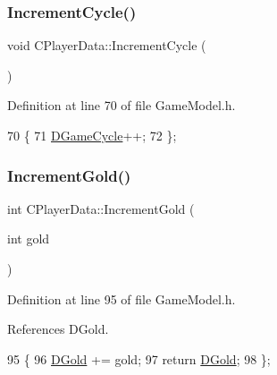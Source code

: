 \subsubsection{\texorpdfstring{Increment\+Cycle()}{IncrementCycle()}}
{\footnotesize\ttfamily void C\+Player\+Data\+::\+Increment\+Cycle (\begin{DoxyParamCaption}{ }\end{DoxyParamCaption})\hspace{0.3cm}{\ttfamily [inline]}}



Definition at line 70 of file Game\+Model.\+h.


\begin{DoxyCode}
70                              \{
71             \hyperlink{classCPlayerData_ae92ca06a63a01681dd9f3ddc17c0e106}{DGameCycle}++;
72         \};
\end{DoxyCode}
\hypertarget{classCPlayerData_a4d99d876561ac76a9d4f7a3e2f7f3edb}{}\label{classCPlayerData_a4d99d876561ac76a9d4f7a3e2f7f3edb} 
\subsubsection{\texorpdfstring{Increment\+Gold()}{IncrementGold()}}
{\footnotesize\ttfamily int C\+Player\+Data\+::\+Increment\+Gold (\begin{DoxyParamCaption}\item[{int}]{gold }\end{DoxyParamCaption})\hspace{0.3cm}{\ttfamily [inline]}}



Definition at line 95 of file Game\+Model.\+h.



References D\+Gold.


\begin{DoxyCode}
95                                    \{
96             \hyperlink{classCPlayerData_afa66ff31262c9b287ae8c13259aae6f3}{DGold} += gold;
97             \textcolor{keywordflow}{return} \hyperlink{classCPlayerData_afa66ff31262c9b287ae8c13259aae6f3}{DGold};   
98         \};
\end{DoxyCode}
\hypertarget{classCPlayerData_a4115ca5ce5e6f10e64c0a310d5348c93}{}\label{classCPlayerData_a4115ca5ce5e6f10e64c0a310d5348c93} 
